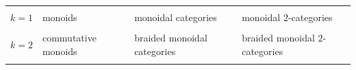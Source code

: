 \documentclass[12pt]{article}
\begin{document}
\begin{longtable}[]{@{}llll@{}}
\begin{minipage}[t]{0.21\columnwidth}
\strut
\end{minipage}\tabularnewline
\begin{minipage}[t]{0.26\columnwidth}\raggedright
\(k=1\)\strut
\end{minipage} & \begin{minipage}[t]{0.21\columnwidth}\raggedright
monoids\strut
\end{minipage} & \begin{minipage}[t]{0.21\columnwidth}\raggedright
monoidal categories\strut
\end{minipage} & \begin{minipage}[t]{0.21\columnwidth}\raggedright
monoidal \(2\)-categories\strut
\end{minipage}\tabularnewline
\begin{minipage}[t]{0.26\columnwidth}\raggedright
\strut
\end{minipage} & \begin{minipage}[t]{0.21\columnwidth}\raggedright
\strut
\end{minipage} & \begin{minipage}[t]{0.21\columnwidth}\raggedright
\strut
\end{minipage} & \begin{minipage}[t]{0.21\columnwidth}\raggedright
\strut
\end{minipage}\tabularnewline
\begin{minipage}[t]{0.26\columnwidth}\raggedright
\(k=2\)\strut
\end{minipage} & \begin{minipage}[t]{0.21\columnwidth}\raggedright
commutative monoids\strut
\end{minipage} & \begin{minipage}[t]{0.21\columnwidth}\raggedright
braided monoidal categories\strut
\end{minipage} & \begin{minipage}[t]{0.21\columnwidth}\raggedright
braided monoidal \(2\)-categories\strut
\end{minipage}\tabularnewline
\begin{minipage}[t]{0.26\columnwidth}\raggedright
\strut
\end{minipage} & \begin{minipage}[t]{0.21\columnwidth}\raggedright
\strut
\end{minipage} & \begin{minipage}[t]{0.21\columnwidth}\raggedright
\strut
\end{minipage} & \begin{minipage}[t]{0.21\columnwidth}\raggedright

\end{minipage}
\end{longtable}
\end{document}
